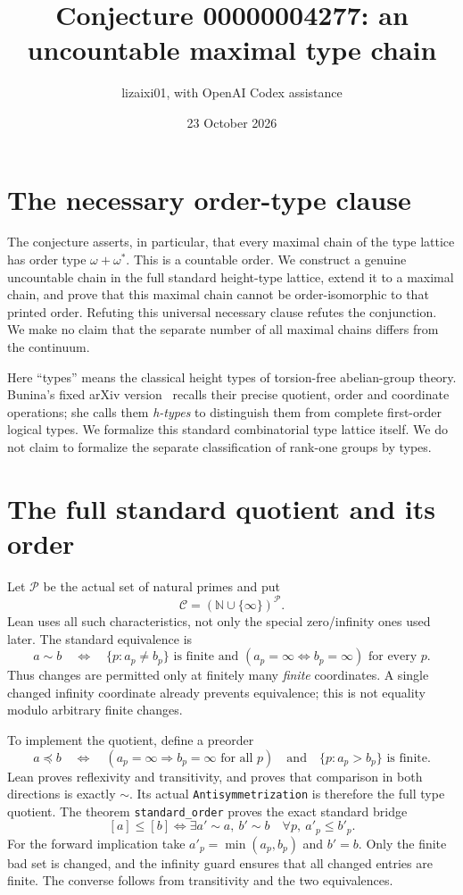 \documentclass[11pt]{article}
\title{Conjecture 00000004277: an uncountable maximal type chain}
\author{lizaixi01, with OpenAI Codex assistance}
\date{23 October 2026}
\begin{document}
\maketitle
\section{The necessary order-type clause}
The conjecture asserts, in particular, that every maximal chain of the
type lattice has order type $\omega+\omega^*$. This is a countable
order. We construct a genuine uncountable chain in the full standard
height-type lattice, extend it to a maximal chain, and prove that this
maximal chain cannot be order-isomorphic to that printed order.
Refuting this universal necessary clause refutes the conjunction.
We make no claim that the separate number of all maximal chains
differs from the continuum.

Here ``types'' means the classical height types of torsion-free
abelian-group theory. Bunina's fixed arXiv version~\cite[Section 3.3,
pp.~4--5]{Bunina} recalls their precise quotient, order and coordinate
operations; she calls them \emph{h-types} to distinguish them from
complete first-order logical types. We formalize this standard
combinatorial type lattice itself. We do not claim to formalize the
separate classification of rank-one groups by types.

\section{The full standard quotient and its order}
Let $\mathcal P$ be the actual set of natural primes and put
\[
 \mathcal C=(\mathbb N\cup\{\infty\})^{\mathcal P}.
\]
Lean uses all such characteristics, not only the special zero/infinity
ones used later. The standard equivalence is
\[
 a\sim b\quad\Longleftrightarrow\quad
 \{p:a_p\ne b_p\}\text{ is finite and }
 (a_p=\infty\iff b_p=\infty)\text{ for every }p.
\]
Thus changes are permitted only at finitely many \emph{finite}
coordinates. A single changed infinity coordinate already prevents
equivalence; this is not equality modulo arbitrary finite changes.

To implement the quotient, define a preorder
\[
 a\preceq b\quad\Longleftrightarrow\quad
 (a_p=\infty\Rightarrow b_p=\infty\text{ for all }p)
 \quad\text{and}\quad \{p:a_p>b_p\}\text{ is finite}.
\]
Lean proves reflexivity and transitivity, and proves that comparison
in both directions is exactly $\sim$. Its actual
\texttt{Antisymmetrization} is therefore the full type quotient.
The theorem \texttt{standard\_order} proves the exact standard bridge
\[
 [a]\le[b]\iff
 \exists a'\sim a,\ b'\sim b\quad\forall p,\ a'_p\le b'_p.
\]
For the forward implication take $a'_p=\min(a_p,b_p)$ and $b'=b$.
Only the finite bad set is changed, and the infinity guard ensures
that all changed entries are finite. The converse follows from
transitivity and the two equivalences.
\end{document}
